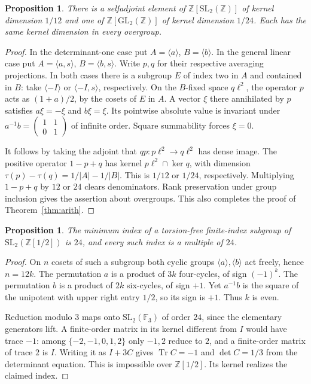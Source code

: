 \documentclass[11pt,a4paper,reqno]{amsart}
\numberwithin{equation}{section}
\newtheorem{proposition}[theorem]{Proposition}
\theoremstyle{remark}
\newcommand{\Z}{\mathbb Z}
\newcommand{\Tr}{\operatorname{Tr}}
\begin{document}
\begin{proposition}\label{prop:sharp}
There is a selfadjoint element of \(\Z[\mathrm{SL}_2(\Z)]\) of kernel dimension \(1/12\) and one of \(\Z[\mathrm{GL}_2(\Z)]\) of kernel dimension \(1/24\). Each has the same kernel dimension in every overgroup.
\end{proposition}
\begin{proof}
In the determinant-one case put \(A=\langle a\rangle\), \(B=\langle b\rangle\). In the general linear case put \(A=\langle a,s\rangle\), \(B=\langle b,s\rangle\). Write \(p,q\) for their respective averaging projections. In both cases there is a subgroup \(E\) of index two in \(A\) and contained in \(B\): take \(\langle -I\rangle\) or \(\langle -I,s\rangle\), respectively. On the \(B\)-fixed space \(q\ell^2\), the operator \(p\) acts as \((1+a)/2\), by the cosets of \(E\) in \(A\). A vector \(\xi\) there annihilated by \(p\) satisfies \(a\xi=-\xi\) and \(b\xi=\xi\). Its pointwise absolute value is invariant under \(a^{-1}b=\left(\begin{smallmatrix}1&1\\0&1\end{smallmatrix}\right)\) of infinite order. Square summability forces \(\xi=0\).

It follows by taking the adjoint that \(qp:p\ell^2\to q\ell^2\) has dense image. The positive operator \(1-p+q\) has kernel \(p\ell^2\cap\ker q\), with dimension \(\tau(p)-\tau(q)=1/|A|-1/|B|\). This is \(1/12\) or \(1/24\), respectively. Multiplying \(1-p+q\) by \(12\) or \(24\) clears denominators. Rank preservation under group inclusion gives the assertion about overgroups. This also completes the proof of Theorem~\ref{thm:arith}.
\end{proof}

\begin{proposition}\label{prop:transfer}
The minimum index of a torsion-free finite-index subgroup of \(\mathrm{SL}_2(\Z[1/2])\) is \(24\), and every such index is a multiple of \(24\).
\end{proposition}
\begin{proof}
On \(n\) cosets of such a subgroup both cyclic groups \(\langle a\rangle,\langle b\rangle\) act freely, hence \(n=12k\). The permutation \(a\) is a product of \(3k\) four-cycles, of sign \((-1)^k\). The permutation \(b\) is a product of \(2k\) six-cycles, of sign \(+1\). Yet \(a^{-1}b\) is the square of the unipotent with upper right entry \(1/2\), so its sign is \(+1\). Thus \(k\) is even.

Reduction modulo \(3\) maps onto \(\mathrm{SL}_2(\mathbb F_3)\) of order \(24\), since the elementary generators lift. A finite-order matrix in its kernel different from \(I\) would have trace \(-1\): among \(\{-2,-1,0,1,2\}\) only \(-1,2\) reduce to \(2\), and a finite-order matrix of trace \(2\) is \(I\). Writing it as \(I+3C\) gives \(\Tr C=-1\) and \(\det C=1/3\) from the determinant equation. This is impossible over \(\Z[1/2]\). Its kernel realizes the claimed index.
\end{proof}
\end{document}
